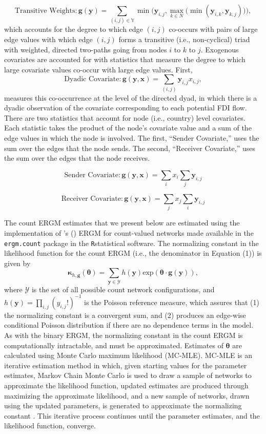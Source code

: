\documentclass[reqno,onecolumn,letterpaper,12pt]{article}
\newcommand\citeapos[1]{\citeauthor{#1}'s (\citeyear{#1})}
\newcommand{\R}{\texttt{R}} %
\begin{document}
$$\text{Transitive Weights}: \bm{g(y)} =  \sum_{(i,j) {\in} \mathbb{Y}}\min\bigg( \bm{y}_{i,j}, \max\limits_{k{\in}N}\Big(\min(\bm{y}_{i,k},\bm{y}_{k,j})\Big) \bigg),$$ which accounts for the degree to which edge $(i,j)$ co-occurs with pairs of large edge values with which edge $(i,j)$ forms a transitive (i.e., non-cyclical) triad with weighted, directed two-paths going from nodes $i$ to $k$ to $j$. Exogenous covariates are accounted for with statistics that measure the degree to which large covariate values co-occur with large edge values. First,
$$ \text{Dyadic Covariate}: \bm{g(y,x)} = \sum_{(i,j)} \bm{y}_{i,j}x_{i,j},$$ measures this co-occurrence at the level of the directed dyad, in which there is a dyadic observation of the covariate corresponding to each potential FDI flow. There are two statistics that account for node (i.e., country) level covariates. Each statistic takes the product of the node's covariate value and a sum of the edge values in which the node is involved. The first, ``Sender Covariate,'' uses the sum over the edges that the node sends. The second, ``Receiver Covariate,'' uses the sum over the edges that the node receives.

$$ \text{Sender Covariate}: \bm{g(y,x)} = \sum_{i}x_i \sum_{j} \bm{y}_{i,j}$$

$$ \text{Receiver Covariate}: \bm{g(y,x)} = \sum_{j}x_j \sum_{i} \bm{y}_{i,j}$$

The count ERGM estimates that we present below are estimated using the implementation of \citeapos{krivitsky2012exponential} ERGM for count-valued networks made available in the \texttt{ergm.count} \citep{ergmcount} package in the \R \space statistical software. The normalizing constant in the likelihood function for the count ERGM (i.e., the denominator in Equation (1)) is given by $$ \bm{\kappa}_{h,\bm{g}}(\bm{\theta}) =  \sum_{\bm{y} \in \bm{\mathcal{Y} } }  h(\bm{y})\text{exp}( \bm {\theta} \cdot \bm{g} (\bm{y}) ), $$ where $\bm{\mathcal{Y} }$ is the set of all possible count network configurations, and $h(\bm{y}) = \prod_{i,j} (y_{i,j}!)^{-1}$ is the Poisson reference measure, which assures that (1) the normalizing constant is a convergent sum, and (2) produces an edge-wise conditional Poisson distribution if there are no dependence terms in the model. As with the binary ERGM, the normalizing constant in the count ERGM is computationally intractable, and must be approximated. Estimates of $\bm {\theta} $ are calculated using Monte Carlo maximum likelihood (MC-MLE). MC-MLE is an iterative estimation method in which, given starting values for the parameter estimates, Markov Chain Monte Carlo is used to draw a sample of networks to approximate the likelihood function, updated estimates are produced through maximizing the approximate likelihood, and a new sample of networks, drawn using the updated parameters, is generated to approximate the normalizing constant \citep{snijders2002markov}. This iterative process continues until the parameter estimates, and the likelihood function, converge.
\end{document}
